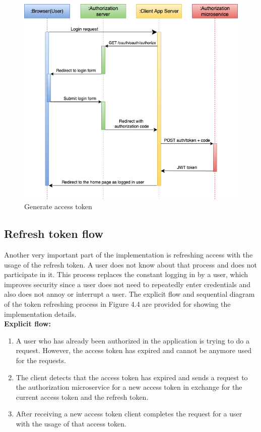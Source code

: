 \begin{figure}[hp]
\centering
\includegraphics[scale=0.56]{../png/generate_token.png}
\caption{Generate access token}
\end{figure}



\subsection{Refresh token flow} Another very important part of the implementation is refreshing access with the usage of the refresh token. A user does not know about that process and does not participate in it. This process replaces the constant logging in by a user, which improves security since a user does not need to repeatedly enter credentials and also does not annoy or interrupt a user. The explicit flow and sequential diagram of the token refreshing process in Figure 4.4 are provided for showing the implementation details.\\

\noindent \textbf{Explicit flow:}

\begin{enumerate}
    \item A user who has already been authorized in the application is trying to do a request. However, the access token has expired and cannot be anymore used for the requests.
    \item The client detects that the access token has expired and sends a request to the authorization microservice for a new access token in exchange for the current access token and the refresh token.
    \item After receiving a new access token client completes the request for a user with the usage of that access token.
\end{enumerate}

